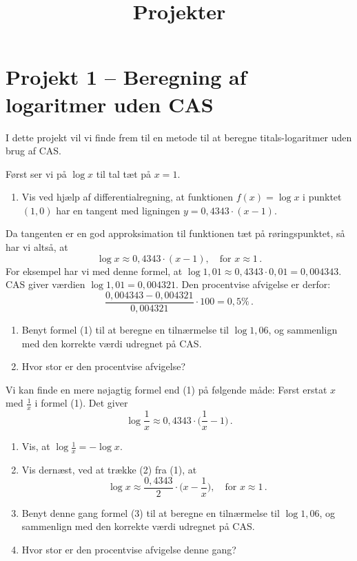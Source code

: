 \documentclass[12pt,oneside,a4paper]{article}
\title{Projekter}
\date{\vspace{-5ex}}
\theoremstyle{plain}
\begin{document}
\maketitle

\section*{Projekt 1 -- Beregning af logaritmer uden CAS}
I dette projekt vil vi finde frem til en metode til at beregne
titals-logaritmer uden brug af CAS.

Først ser vi på $\log x$ til tal tæt på $x=1$.

\begin{enumerate}[label=(\alph*)]
    \item Vis ved hjælp af differentialregning, at funktionen $f(x) = \log x$ i
        punktet $(1, 0)$ har en tangent med ligningen $y = 0,4343 \cdot (x-1)$.
\end{enumerate}
Da tangenten er en god approksimation til funktionen tæt på røringspunktet,
så har vi altså, at 
\[
    \tag{1}
    \log x \approx 0,4343\cdot(x-1),\quad \mbox{for $x\approx 1$}\,.
\]
For eksempel har vi med denne formel, at $\log 1,01 \approx 0,4343\cdot 0,01 = 0,004343$.
CAS giver værdien $\log 1,01 = 0,004321$. Den procentvise afvigelse er derfor:
\[
    \frac{0,004343-0,004321}{0,004321}\cdot 100 = 0,5 \% \,.
\]

\begin{enumerate}[label=(\alph*), resume]
    \item Benyt formel (1) til at beregne en tilnærmelse til $\log
        1,06$, og sammenlign med den korrekte værdi udregnet på CAS.
    \item Hvor stor er den procentvise afvigelse?
\end{enumerate}

Vi kan finde en mere nøjagtig formel end (1) på følgende måde: Først erstat $x$ med
$\frac1x$ i formel (1). Det giver
\[
    \tag{2}
    \log\frac1x \approx 0,4343\cdot\Big(\frac1x-1\Big)\,.
\]

\begin{enumerate}[label=(\alph*), resume]
    \item Vis, at $\log\frac1x = -\log x$.
    \item Vis dernæst, ved at trække (2) fra (1), at 
        \[
            \tag{3}
            \log x \approx \frac{0,4343}{2} \cdot \Big(x-\frac1x\Big),\quad
            \mbox{for $x\approx 1$}\,.
            \]
    \item Benyt denne gang formel (3) til at beregne en tilnærmelse til $\log
        1,06$, og sammenlign med den korrekte værdi udregnet på CAS.
    \item Hvor stor er den procentvise afvigelse denne gang?
\end{enumerate}
\end{document}
